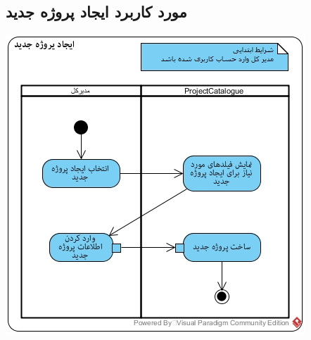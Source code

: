 \subsection*{مورد کاربرد ایجاد پروژه جدید}
\vspace{2cm}
\begin{center}
\includegraphics[width=\textwidth]{ActivityDiagramsWithSwimlanes/33.jpg}
\end{center}

\newpage
\vspace{1cm}
